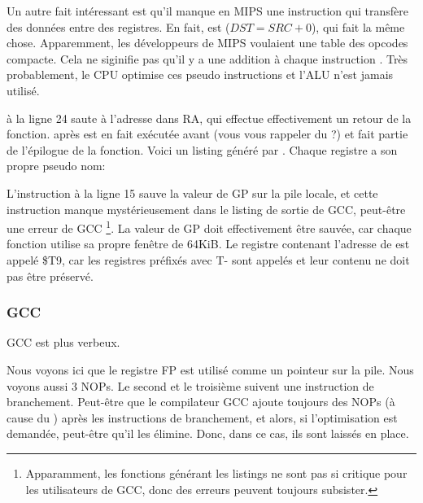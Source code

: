 Un autre fait intéressant est qu'il manque en MIPS une instruction qui transfère
des données entre des registres.
En fait,   est  ($DST=SRC+0$), qui
fait la même chose.
Apparemment, les développeurs de MIPS voulaient une table des opcodes compacte.
Cela ne siginifie pas qu'il y a une addition à chaque instruction .
Très probablement, le \ac{CPU} optimise ces pseudo instructions et l'\ac{ALU} n'est
jamais utilisé.


 à la ligne 24 saute à l'adresse dans \ac{RA}, qui effectue effectivement
un retour de la fonction.
 après  est en fait exécutée avant  (vous vous rappeler
du ?) et fait partie de l'épilogue de la fonction.
Voici un listing généré par \IDA. Chaque registre a son propre pseudo nom:



L'instruction à la ligne 15 sauve la valeur de GP sur la pile locale, et cette
instruction manque mystérieusement dans le listing de sortie de GCC, peut-être
une erreur de GCC
\footnote{Apparamment, les fonctions générant les listings ne sont pas si critique
pour les utilisateurs de GCC, donc des erreurs peuvent toujours subsister.}.
La valeur de GP doit effectivement être sauvée, car chaque fonction utilise sa
propre fenêtre de 64KiB.
Le registre contenant l'adresse de \puts est appelé \$T9, car les registres
préfixés avec T- sont appelés  et leur contenu ne doit pas être
préservé. 

\subsubsection{GCC \NonOptimizing}

GCC \NonOptimizing est plus verbeux.



Nous voyons ici que le registre FP est utilisé comme un pointeur sur la pile.
Nous voyons aussi 3 \ac{NOP}s.
Le second et le troisième suivent une instruction de branchement.
Peut-être que le compilateur GCC ajoute toujours des \ac{NOP}s (à cause du
) après les instructions de branchement, et
alors, si l'optimisation est demandée, peut-être qu'il les élimine.
Donc, dans ce cas, ils sont laissés en place.

